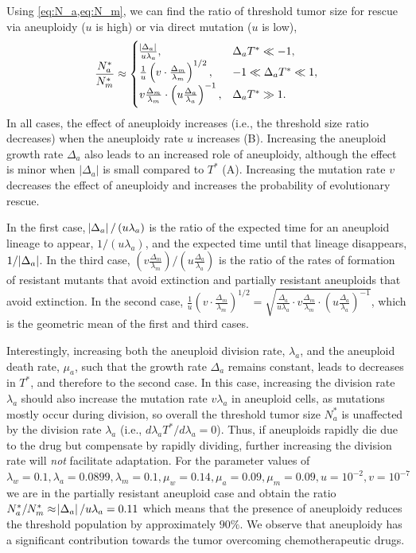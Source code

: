\documentclass[12pt]{extarticle}
\begin{document}
Using \cref{eq:N_a,eq:N_m}, we can find the ratio of threshold tumor size for rescue via aneuploidy ($u$ is high) or via direct mutation ($u$ is low),
\begin{equation} \label{eq:N_ratio}
\frac{N^*_a}{N^*_m} \approx \begin{cases}
    \frac{\abs{\Delta_a}}{u\lambda_a} ,&
  \Delta_a T^* \ll -1 ,\\ 
  \frac{1}{u}\left(v \cdot \frac{\Delta_m}{\lambda_m}\right)^{1/2} ,&
  -1 \ll \Delta_a T^* \ll 1  ,\\ 
  v \frac{\Delta_m}{\lambda_m} \cdot \left(u\frac{\Delta_a}{\lambda_a}\right)^{-1}  ,&
   \Delta_a T^* \gg 1 .
  \end{cases}
\end{equation}
In all cases, the effect of aneuploidy increases (i.e., the threshold size ratio decreases) when the aneuploidy rate $u$ increases (B). Increasing the aneuploid growth rate $\Delta_a$ also leads to an increased role of aneuploidy, although the effect is minor when $|\Delta_a|$ is small compared to $T^*$ (A). Increasing the mutation rate $v$ decreases the effect of aneuploidy and increases the probability of evolutionary rescue.

In the first case, $\abs{\Delta_a}/\left(u\lambda_a\right)$ is  the ratio of the expected time for an aneuploid lineage to appear, $1/\left(u\lambda_a\right)$, and the expected time until that lineage disappears, $1/\abs{\Delta_a}$.
In the third case, $\left(v \frac{\Delta_m}{\lambda_m}\right) / \left(u \frac{\Delta_a}{\lambda_a}\right)$ is the ratio of the rates of formation of resistant mutants that avoid extinction and partially resistant aneuploids that avoid extinction.
In the second case, $\frac{1}{u}\left(v \cdot \frac{\Delta_m}{\lambda_m}\right)^{1/2}=\sqrt{\frac{\Delta_a}{u\lambda_a} \cdot v \frac{\Delta_m}{\lambda_m} \cdot \left(u\frac{\Delta_a}{\lambda_a}\right)^{-1}}$, which is the geometric mean of the first and third cases.

Interestingly, increasing both the aneuploid division rate, $\lambda_a$, and the aneuploid death rate, $\mu_a$, such that the growth rate $\Delta_a$ remains constant, leads to decreases in $T^*$, and therefore to the second case. In this case, increasing the division rate $\lambda_a$ should also increase the mutation rate $v\lambda_a$ in aneuploid cells, as mutations mostly occur during division, so overall the threshold tumor size $N_a^*$ is unaffected by the division rate $\lambda_a$ (i.e., $d \lambda_a T^*/d\lambda_a = 0$). Thus, if aneuploids rapidly die due to the drug but compensate by rapidly dividing, further increasing  the division rate will \emph{not} facilitate adaptation.
For the parameter values of  $\lambda_w=0.1, \lambda_a=0.0899,\lambda_m=0.1,\mu_w=0.14,\mu_a=0.09,\mu_m=0.09, u=10^{-2}, v=10^{-7}$ we are in the partially resistant aneuploid case and obtain the ratio $N^*_a/N^*_m\approx\abs{\Delta_a}/u\lambda_a=0.11$ which means that the presence of aneuploidy reduces the threshold population by approximately $90\%$. We observe that aneuploidy has a significant contribution towards the tumor overcoming chemotherapeutic drugs. 
\end{document}
